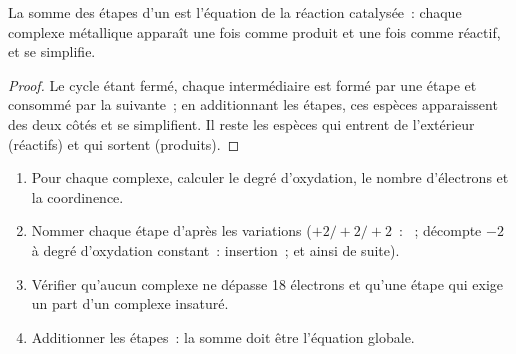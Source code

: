 \begin{proposition}\label{prop:b2:catalytic-cycles:cycle-sum}
La somme des étapes d'un  est l'équation de la réaction catalysée~:
chaque complexe métallique apparaît une fois comme produit et une fois comme réactif, et se simplifie.
\end{proposition}

\begin{proof}
Le cycle étant fermé, chaque intermédiaire est formé par une étape et consommé par la suivante~;
en additionnant les étapes, ces espèces apparaissent des deux côtés et se simplifient. Il reste les
espèces qui entrent de l'extérieur (réactifs) et qui sortent (produits).
\end{proof}

\begin{method}\label{met:b2:catalytic-cycles:read-cycle}
\begin{enumerate}
  \item Pour chaque complexe, calculer le degré d'oxydation, le nombre d'électrons et la
        coordinence.
  \item Nommer chaque étape d'après les variations ($+2/+2/+2$~: ~; décompte $-2$ à
        degré d'oxydation constant~: insertion~; et ainsi de suite).
  \item Vérifier qu'aucun complexe ne dépasse 18 électrons et qu'une étape qui exige un 
        part d'un complexe insaturé.
  \item Additionner les étapes~: la somme doit être l'équation globale.
\end{enumerate}
\end{method}

